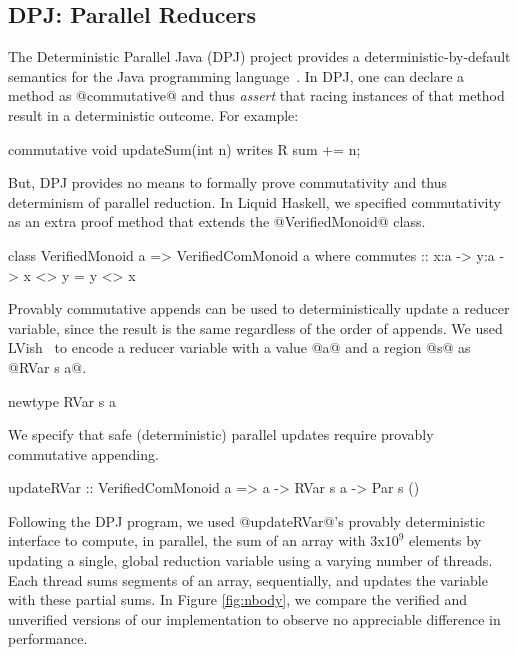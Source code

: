\subsection{DPJ: Parallel Reducers}
\label{sec:reducer}
The Deterministic Parallel Java (DPJ) project provides
a deterministic-by-default semantics for the Java programming language~\cite{DPJ}.
%
In DPJ, one can declare a method as @commutative@ and thus {\em assert} that
racing instances of that method result in a deterministic outcome.
For example:
%
\begin{code}
commutative void updateSum(int n) writes R
  { sum += n; }
\end{code}
But, DPJ provides no means to formally prove commutativity and thus
determinism of parallel reduction.
In Liquid Haskell, we specified commutativity as an extra proof method
that extends the @VerifiedMonoid@ class.
%
\begin{mcode}
 class VerifiedMonoid a => VerifiedComMonoid a where
  commutes :: x:a -> y:a -> { x <> y = y <> x }
\end{mcode}
%
Provably commutative appends can be used to deterministically
update a reducer variable, since the result is the same regardless
of the order of appends.
%
We used LVish~\cite{kuper2014freeze} to
encode a reducer variable with a value @a@ and a region @s@
as @RVar s a@.
\begin{mcode}
 newtype RVar s a
\end{mcode}
We specify that safe (\ie deterministic)
parallel updates require provably commutative appending.
\begin{mcode}
  updateRVar :: VerifiedComMonoid a
             => a -> RVar s a -> Par s ()
\end{mcode}
%
Following the DPJ program, we used @updateRVar@'s provably deterministic interface
to compute, in parallel, the sum of an array with $3$x$10^9$ elements by updating
a single, global reduction variable using a varying number of threads.
%
Each thread sums segments of an array, sequentially, and updates the variable
with these partial sums.
%
In Figure \ref{fig:nbody}, we compare the verified and unverified versions
of our implementation to observe no appreciable
difference in performance.

